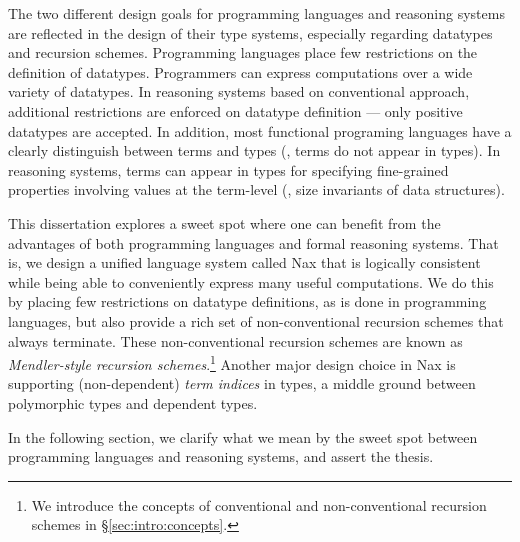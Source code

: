 The two different design goals for programming languages and reasoning systems
are reflected in the design of their type systems, especially regarding
datatypes and recursion schemes. Programming languages place few restrictions
on the definition of datatypes. Programmers can express computations over
a wide variety of datatypes. In reasoning systems based on
conventional approach, additional restrictions are enforced on
datatype definition --- only positive datatypes are accepted. In addition,
most functional programing languages have a clearly distinguish between
terms and types (\ie, terms do not appear in types). In reasoning systems,
terms can appear in types for specifying fine-grained properties involving
values at the term-level (\eg, size invariants of data structures).

This dissertation explores a sweet spot where one can benefit from
the advantages of both programming languages and formal reasoning systems.
That is, we design a unified language system called Nax that is
logically consistent while being able to conveniently express
many useful computations. We do this by placing few restrictions
on datatype definitions, as is done in programming languages, but also
provide a rich set of non-conventional recursion schemes that always terminate.
These non-conventional recursion schemes are known as
\emph{Mendler-style recursion schemes}.\footnote{
	We introduce the concepts of conventional and
	non-conventional recursion schemes in \S\ref{sec:intro:concepts}.}
Another major design choice in Nax is supporting (non-dependent)
\emph{term indices} in types, a middle ground between
polymorphic types and dependent types.

In the following section, we clarify what we mean by the sweet spot between
programming languages and reasoning systems, and assert the thesis.

